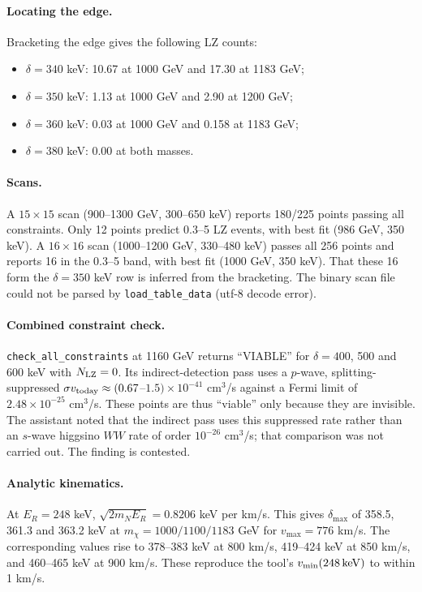 \documentclass[11pt,a4paper]{article}
\begin{document}
\paragraph{Locating the edge.} Bracketing the edge gives the following LZ counts:
\begin{itemize}
\item $\delta=340$ keV: 10.67 at 1000 GeV and 17.30 at 1183 GeV;
\item $\delta=350$ keV: 1.13 at 1000 GeV and 2.90 at 1200 GeV;
\item $\delta=360$ keV: 0.03 at 1000 GeV and 0.158 at 1183 GeV;
\item $\delta=380$ keV: 0.00 at both masses.
\end{itemize}

\paragraph{Scans.} A $15\times15$ scan (900--1300 GeV, 300--650 keV) reports 180/225 points passing all constraints. Only 12 points predict 0.3--5 LZ events, with best fit (986 GeV, 350 keV). A $16\times16$ scan (1000--1200 GeV, 330--480 keV) passes all 256 points and reports 16 in the 0.3--5 band, with best fit (1000 GeV, 350 keV). That these 16 form the $\delta=350$ keV row is inferred from the bracketing. The binary scan file could not be parsed by \texttt{load\_table\_data} (utf-8 decode error).

\paragraph{Combined constraint check.} \texttt{check\_all\_constraints} at 1160 GeV returns ``VIABLE'' for $\delta=400$, 500 and 600 keV with $N_{\rm LZ}=0$. Its indirect-detection pass uses a $p$-wave, splitting-suppressed $\sigma v_{\rm today}\approx(0.67$--$1.5)\times10^{-41}$ cm$^3$/s against a Fermi limit of $2.48\times10^{-25}$ cm$^3$/s. These points are thus ``viable'' only because they are invisible. The assistant noted that the indirect pass uses this suppressed rate rather than an $s$-wave higgsino $WW$ rate of order $10^{-26}$ cm$^3$/s; that comparison was not carried out. The finding is contested.

\paragraph{Analytic kinematics.} At $E_R=248$ keV, $\sqrt{2m_NE_R}=0.8206$ keV per km/s. This gives $\delta_{\max}$ of 358.5, 361.3 and 363.2 keV at $m_\chi=1000/1100/1183$ GeV for $v_{\max}=776$ km/s. The corresponding values rise to 378--383 keV at 800 km/s, 419--424 keV at 850 km/s, and 460--465 keV at 900 km/s. These reproduce the tool's $v_{\min}(248\,{\rm keV})$ to within 1 km/s.
\end{document}
